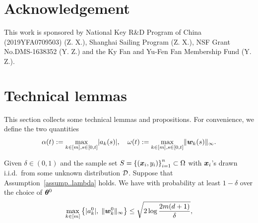 \documentclass{article}
\begin{document}
\section{Acknowledgement}
This work is sponsored by National Key R\&D Program of China (2019YFA0709503) (Z. X.), Shanghai Sailing Program (Z. X.), NSF Grant No.DMS-1638352 (Y. Z.) and the Ky Fan and Yu-Fen Fan Membership Fund (Y. Z.).




\appendix
\section{Technical lemmas}
This section collects some technical lemmas and propositions. For convenience, we define the two quantities
\begin{equation}
    \alpha(t):=\max\limits_{k\in[m],s\in[0,t]}\lvert a_k(s)\rvert, \quad \omega(t):=\max\limits_{k\in[m],s\in[0,t]}\lVert\bm{w}_k(s)\rVert_{\infty}.
\end{equation}
\begin{lem}\label{lem..InitialParameter}
    Given $\delta\in(0,1)$ and the sample set $S = {\{(\bm{x}_i, y_i)\}}_{i=1}^n\subset\Omega$ with $\bm{x}_i$'s drawn i.i.d.\ from some unknown distribution $\mathcal{D}$. Suppose that Assumption~\ref{assump..lambda} holds. We have with probability at least $1-\delta$ over the choice of $\bm{\theta}^0$
    \begin{equation}\label{eqn:lem1}
        \max\limits_{k\in[m]}\left\{\lvert a_k^0\rvert,\;\lVert\bm{w}_k^0\rVert_{\infty}\right \}\leq \sqrt{2\log\frac{2m(d+1)}{\delta}},
    \end{equation}
\end{lem}
\end{document}
